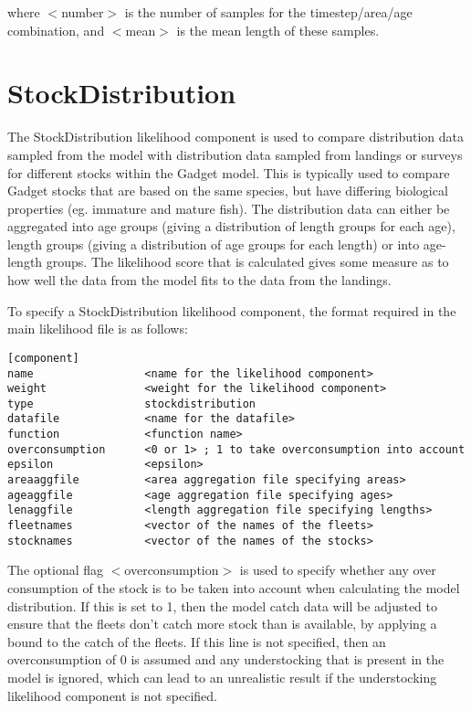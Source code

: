 \documentclass[10pt,twoside]{book}
\begin{document}
where $<$number$>$ is the number of samples for the timestep/area/age combination, and $<$mean$>$ is the mean length of these samples.

\section{StockDistribution}\label{sec:stockdist}
The StockDistribution likelihood component is used to compare distribution data sampled from the model with distribution data sampled from landings or surveys for different stocks within the Gadget model.  This is typically used to compare Gadget stocks that are based on the same species, but have differing biological properties (eg. immature and mature fish).  The distribution data can either be aggregated into age groups (giving a distribution of length groups for each age), length groups (giving a distribution of age groups for each length) or into age-length groups.  The likelihood score that is calculated gives some measure as to how well the data from the model fits to the data from the landings.

\bigskip
To specify a StockDistribution likelihood component, the format required in the main likelihood file is as follows:

{\small\begin{verbatim}
[component]
name                 <name for the likelihood component>
weight               <weight for the likelihood component>
type                 stockdistribution
datafile             <name for the datafile>
function             <function name>
overconsumption      <0 or 1> ; 1 to take overconsumption into account
epsilon              <epsilon>
areaaggfile          <area aggregation file specifying areas>
ageaggfile           <age aggregation file specifying ages>
lenaggfile           <length aggregation file specifying lengths>
fleetnames           <vector of the names of the fleets>
stocknames           <vector of the names of the stocks>
\end{verbatim}}

The optional flag $<$overconsumption$>$ is used to specify whether any over consumption of the stock is to be taken into account when calculating the model distribution.  If this is set to 1, then the model catch data will be adjusted to ensure that the fleets don't catch more stock than is available, by applying a bound to the catch of the fleets.  If this line is not specified, then an overconsumption of 0 is assumed and any understocking that is present in the model is ignored, which can lead to an unrealistic result if the understocking likelihood component is not specified.
\end{document}
